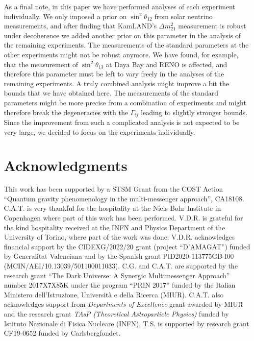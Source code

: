 \documentclass[aps, prd, onecolumn, tightenlines, notitlepage, superscriptaddress, nofootinbib, preprintnumbers, floatfix,showkeys,11pt]{revtex4-2}
\begin{document}
As a final note, in this paper we have performed analyses of each experiment individually. We only imposed a prior on $\sin^2\theta_{12}$ from solar neutrino measurements, and after finding that KamLAND's $\Delta m_{21}^2$ measurement is robust under decoherence we added another prior on this parameter in the analysis of the remaining experiments. The measurements of the standard parameters at the other experiments might not be robust anymore. We have found, for example, that the measurement of $\sin^2\theta_{13}$ at Daya Bay and RENO is affected, and therefore this parameter must be left to vary freely in the analyses of the remaining experiments. A truly combined analysis might improve a bit the bounds that we have obtained here. The measurements of the standard parameters might be more precise from a combination of experiments and might therefore break the degeneracies with the $\Gamma_{ij}$ leading to slightly stronger bounds. Since the improvement from such a complicated analysis is not expected to be very large, we decided to focus on the experiments individually.








\section*{Acknowledgments}
This work has been supported by a STSM Grant from the COST Action “Quantum gravity phenomenology in the multi-messenger approach”, CA18108.
%
C.A.T. is very thankful for the hospitality at the Niels Bohr Institute in Copenhagen where part of this work has been performed.
%
V.D.R. is grateful for the kind hospitality received at the INFN and Physics Department of the University of Torino, where part of the work was done.
%
V.D.R. acknowledges financial support by the CIDEXG/2022/20 grant (project ``D'AMAGAT'') funded by
Generalitat Valenciana and by the Spanish grant PID2020-113775GB-I00 (MCIN/AEI/10.13039/501100011033).
%
C.G. and C.A.T. are supported by the research grant ``The Dark Universe: A Synergic Multimessenger Approach'' number 2017X7X85K under the program ``PRIN 2017'' funded by the Italian Ministero dell'Istruzione, Universit\`a e della Ricerca (MIUR). C.A.T. also acknowledges support from {\sl Departments of Excellence} grant awarded by MIUR and the research grant {\sl TAsP (Theoretical Astroparticle Physics)} funded by Istituto Nazionale di Fisica Nucleare (INFN).
%
T.S. is supported by research grant CF19-0652 funded by Carlsbergfondet.
%
\end{document}

